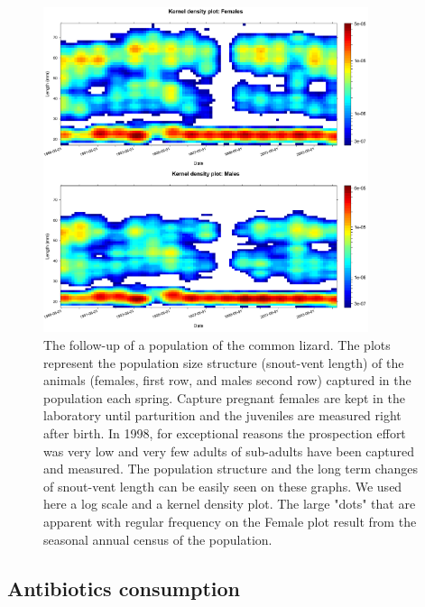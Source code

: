 \begin{figure}[!ht] %
\centering
\includegraphics[width=0.85\textwidth]{2_Methodo/Fig/Fig22-3.pdf}
\caption[The follow-up of a population of the common lizard]{ The follow-up of a population of the common lizard. The plots represent the
population size structure (snout-vent length) of the animals (females, first
row, and males second row) captured in the population each spring. Capture
pregnant females are kept in the laboratory until parturition and the juveniles
are measured right after birth. In 1998, for exceptional reasons the prospection
effort was very low and very few adults of sub-adults have been captured and
measured. The population structure and the long term changes of snout-vent
length can be easily seen on these graphs. We used here a log scale and a kernel
density plot. The large "dots" that are apparent with regular frequency on the
Female plot result from the seasonal annual census of the population.
}
\label{Fig22-3}
\end{figure}


\subsection{Antibiotics consumption}

